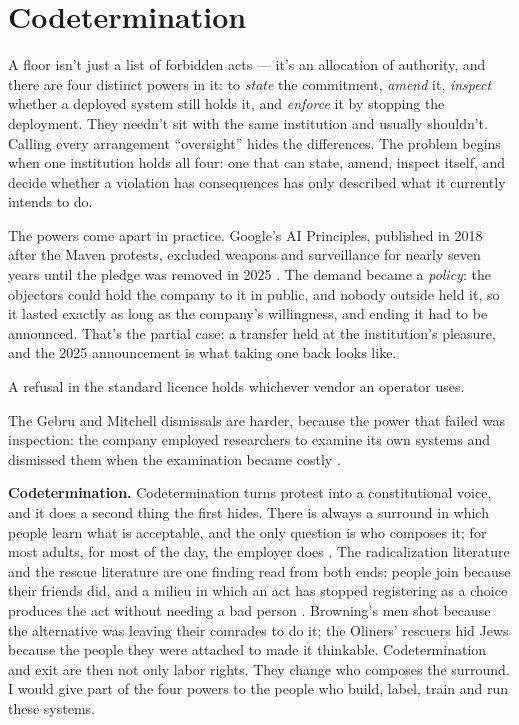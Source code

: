\chapter{Codetermination}
\label{sec:9}
A floor isn't just a list of forbidden acts — it's an allocation of authority, and there are four distinct powers in it: to \emph{state} the commitment, \emph{amend} it, \emph{inspect} whether a deployed system still holds it, and \emph{enforce} it by stopping the deployment. They needn't sit with the same institution and usually shouldn't. Calling every arrangement “oversight” hides the differences. The problem begins when one institution holds all four: one that can state, amend, inspect itself, and decide whether a violation has consequences has only described what it currently intends to do.

The powers come apart in practice. Google's AI Principles, published in 2018 after the Maven protests, excluded weapons and surveillance \autocite{castelino2018google,conger2018maven,pichai2018principles} for nearly seven years until the pledge was removed in 2025 \autocite{google2025principles}. The demand became a \emph{policy}: the objectors could hold the company to it in public, and nobody outside held it, so it lasted exactly as long as the company's willingness, and ending it had to be announced. That's the partial case: a transfer held at the institution's pleasure, and the 2025 announcement is what taking one back looks like. 

A refusal in the standard licence holds whichever vendor an operator uses.

The Gebru and Mitchell dismissals are harder, because the power that failed was inspection: the company employed researchers to examine its own systems and dismissed them when the examination became costly \autocite{dickey2020gebru,dickey2021mitchell}.

\textbf{Codetermination.} Codetermination turns protest into a constitutional voice, and it does a second thing the first hides. There is always a surround in which people learn what is acceptable, and the only question is who composes it; for most adults, for most of the day, the employer does \autocite{anderson2017private}. The radicalization literature and the rescue literature are one finding read from both ends: people join because their friends did, and a milieu in which an act has stopped registering as a choice produces the act without needing a bad person \autocite{sageman2008leaderless,mccauley2008mechanisms,malthaner2014radical}. Browning's men shot because the alternative was leaving their comrades to do it; the Oliners' rescuers hid Jews because the people they were attached to made it thinkable. Codetermination and exit are then not only labor rights. They change who composes the surround. I would give part of the four powers to the people who build, label, train and run these systems.

